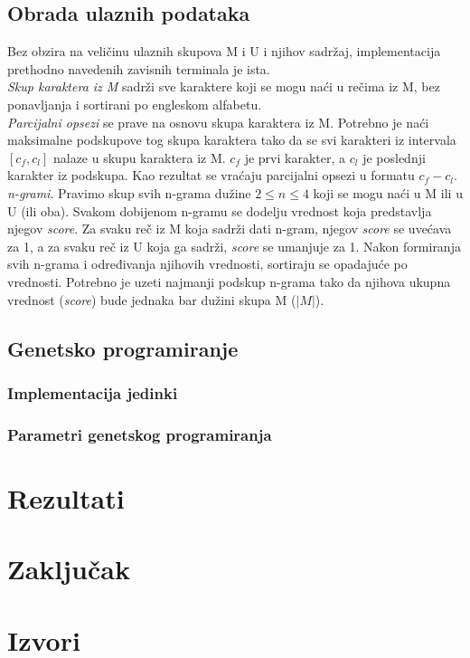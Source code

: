 \documentclass{article}
\begin{document}
\subsection{Obrada ulaznih podataka}
Bez obzira na veličinu ulaznih skupova M i U i njihov sadržaj, implementacija prethodno navedenih zavisnih terminala je ista. \\
\textit{Skup karaktera iz M} sadrži sve karaktere koji se mogu naći u rečima iz M, bez ponavljanja i sortirani po engleskom alfabetu. \\
\textit{Parcijalni opsezi} se prave na osnovu skupa karaktera iz M. Potrebno je naći maksimalne podskupove tog skupa karaktera tako da se svi karakteri iz intervala $[c_f, c_l]$ nalaze u skupu karaktera iz M. $c_f$ je prvi karakter, a $c_l$ je poslednji karakter iz podskupa. Kao rezultat se vraćaju parcijalni opsezi u formatu $c_f - c_l$. \\
\textit{n-grami}. Pravimo skup svih n-grama dužine $2 \leq n \leq 4$ koji se mogu naći u M ili u U (ili oba). Svakom dobijenom n-gramu se dodelju vrednost koja predstavlja njegov \textit{score}. Za svaku reč iz M koja sadrži dati n-gram, njegov \textit{score} se uvećava za 1, a za svaku reč iz U koja ga sadrži, \textit{score} se umanjuje za 1. Nakon formiranja svih n-grama i određivanja njihovih vrednosti, sortiraju se opadajuće po vrednosti.
Potrebno je uzeti najmanji podskup n-grama tako da njihova ukupna vrednost (\textit{score}) bude jednaka bar dužini skupa M ($|M|$).

\subsection{Genetsko programiranje}
\subsubsection{Implementacija jedinki}
\subsubsection{Parametri genetskog programiranja}

\section{Rezultati}
\section{Zaključak}
\section{Izvori}
\end{document}
